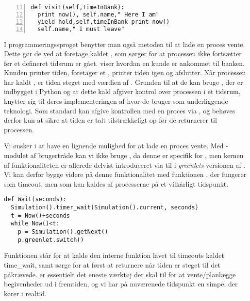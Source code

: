 \begin{lstlisting}[firstnumber=11 , stepnumber=2, numbers=left,float=hbtp, label=fig:simpy:yield, caption= Et yield i \simpy (Taget fra Bank05.py i eksemplet fra \simpy)] 
def visit(self,timeInBank): 
  print now(), self.name," Here I am" 
  yield hold,self,timeInBank print now()
  self.name," I must leave" 
\end{lstlisting}
I programmeringssproget \simpy benytter man også metoden til at lade en proces vente. Dette gør de ved at
foretage kaldet , som sørger for at processen ikke
fortsætter før et defineret tidsrum er gået.  viser hvordan en kunde er ankommet til banken. Kunden printer tiden, foretager et , printer tiden igen og afslutter.  Når processen har kaldt , er tiden steget med værdien af . Grunden til at de kan bruge , der er indbygget i Python og at dette kald afgiver kontrol over processen i et tidsrum, knytter sig til deres implementeringen af \simpy hvor de bruger   som underliggende teknologi. Som standard kan   afgive kontrollen med en proces via , og \simpy behøves derfor kun at sikre at tiden er talt tilstrækkeligt op før de returnerer til processen.

 Vi ønsker i \pycsp at have en lignende mulighed for at lade en proces vente. Med -modulet af brugertråde kan vi ikke bruge , da denne er specifik for , men kernen af funktionaliteten er allerede delvist introduceret via  til  i \emph{greenlets}-versionen af \pycsp. Vi kan derfor bygge videre på denne funktionalitet med funktionen , der fungerer som timeout, men som kan kaldes af processerne på et vilkårligt tidspunkt.

\begin{lstlisting}[firstnumber=20,float=hbtp, label=fig:wait, caption=Wait i \code{simulering}-versionen.] 
def Wait(seconds):
  Simulation().timer_wait(Simulation().current, seconds)
  t = Now()+seconds
  while Now()<t:
    p = Simulation().getNext() 
    p.greenlet.switch()
\end{lstlisting}

Funktionen  står for at kalde den interne funktion lavet til timeouts kaldet time\_wait, samt sørge for at først at returnere når tiden er steget til det påkrævede.  er essentielt det eneste værktøj der skal til for at vente/planlægge begivenheder ud i fremtiden, og vi har på nuværenede tidspunkt en simpel \des der kører i realtid. 

